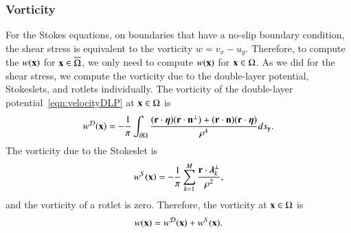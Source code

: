 \documentclass[preprint, 10pt]{elsarticle}
\begin{document}
\subsubsection{Vorticity}
For the Stokes equations, on boundaries that have a no-slip boundary
condition, the shear stress is equivalent to the vorticity $w = v_x -
u_y$.  Therefore, to compute the $w({\mathbf{x}})$ for ${\mathbf{x}} \in
\overline{\Omega}$, we only need to compute $w({\mathbf{x}})$ for ${\mathbf{x}} \in
\Omega$.  As we did for the shear stress, we compute the vorticity due
to the double-layer potential, Stokeslets, and rotlets individually.
The vorticity of the double-layer potential~\eqref{eqn:velocityDLP} at
${\mathbf{x}} \in \Omega$ is
\begin{align}
  w^{{\mathcal{D}}}({\mathbf{x}}) = -\frac{1}{\pi}\int_{{\partial}\Omega} 
    \frac{({\mathbf{r}} \cdot {\boldsymbol\eta})({\mathbf{r}} \cdot {\mathbf{n}}^\perp) + 
    ({\mathbf{r}} \cdot {\mathbf{n}})({\mathbf{r}} \cdot {\boldsymbol\eta})}{\rho^4}ds_{{\mathbf{y}}}.
  \label{eqn:vorticityDLP}
\end{align}
The vorticity due to the Stokeslet is
\begin{align*}
  w^S({\mathbf{x}}) = -\frac{1}{\pi} \sum_{k=1}^{M} 
    \frac{{\mathbf{r}} \cdot {\boldsymbol\lambda}_k^\perp}{\rho^2},
\end{align*}
and the vorticity of a rotlet is zero.  Therefore, the vorticity at ${\mathbf{x}}
\in \Omega$ is
\begin{align*}
  w({\mathbf{x}}) = w^{\mathcal{D}}({\mathbf{x}}) + w^S({\mathbf{x}}).
\end{align*}


\end{document}
